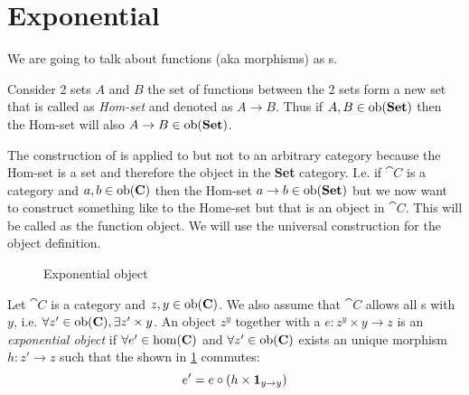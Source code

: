 \section{Exponential}
We are going to talk about functions (aka morphisms) as
s. 

\begin{example}
\label{ex:homset}
Consider 2 sets $A$ and $B$ the set of functions between the 2 sets
form a new set that is called as \textit{Hom-set} and denoted as $A
\to B$. Thus if $A,B \in \mathrm{ob}(\mathbf{Set})$ then the Hom-set will also $A
\to B \in \mathrm{ob}(\mathbf{Set})$. 
\end{example}

The construction of  is applied to
 but not to an arbitrary category because
the Hom-set is a set and therefore the object in the \textbf{Set}
category. I.e. if $\cat{C}$ is a category and $a, b \in \mathrm{ob}(\mathbf{C})$
then the Hom-set $a \to b \in \mathrm{ob}(\mathbf{Set})$ but we now want to
construct something like to the Home-set but that is an object in
$\cat{C}$. This will be called as the function object. We will use the
universal construction for the object definition.

\begin{definition}[Exponential]
\label{def:exponential}
\begin{figure}
  \centering
  \caption{Exponential object}
  \label{fig:exponential}
\end{figure}
Let $\cat{C}$ is a category and $z, y \in \mathrm{ob}(\mathbf{C})$. We also assume
that $\cat{C}$ allows all s with $y$, i.e.
$\forall z' \in \mathrm{ob}(\mathbf{C}), \exists z' \times y$. An object $z^y$
together with a  $e: z^y \times y \to z$ is 
an \textit{exponential object} if $\forall e' \in \mathrm{hom}(\mathbf{C})$ and
$\forall z' \in \mathrm{ob}(\mathbf{C})$ exists an
unique morphism $h: z' \to z$ such that the
 shown in \cref{fig:exponential}
commutes:
\[
e' = e \circ \left(h \times \mathbf{1}_{ y \to y } \right)
\]
\end{definition}

